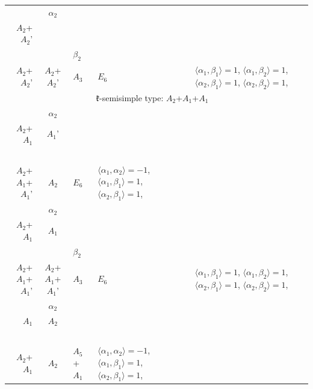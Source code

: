 \documentclass[12pt]{report}
\begin{document}
\begin{appendix}
{\begin{longtable}{rcl p{1cm}p{1cm}p{3cm} }
\\
\begin{tabular}{cc}$\alpha_1$+ & $\alpha_2$\\\tiny{ $A_2$+$A_2$' } & \tiny{  }\end{tabular} &\begin{tabular}{c} = \\~ \end{tabular} & \begin{tabular}{cc}$\beta_1$+ & $\beta_2$\\\tiny{ $A_2$+$A_2$' } & \tiny{ $A_2$+$A_2$' }\end{tabular} & $A_3$ & $E_6$ &  $\langle\alpha_1, \beta_1\rangle=1$, $\langle\alpha_1, \beta_2\rangle=1$, $\langle\alpha_2, \beta_1\rangle=1$, $\langle\alpha_2, \beta_2\rangle=1$, 
\\
\hline\multicolumn{5}{c}{$\mathfrak{k}$-semisimple type: $A_2$+$A_1$+$A_1$}\\
\hline\hline\begin{tabular}{cc}$\alpha_1$+ & $\alpha_2$\\\tiny{ $A_2$+$A_1$ } & \tiny{ $A_1$' }\end{tabular} &\begin{tabular}{c} = \\~ \end{tabular} & \begin{tabular}{c}$\beta_1$\\\tiny{ $A_2$+$A_1$+$A_1$' }\end{tabular} & $A_2$ & $E_6$ & $\langle\alpha_1, \alpha_2\rangle=-1$,  $\langle\alpha_1, \beta_1\rangle=1$, $\langle\alpha_2, \beta_1\rangle=1$, 
\\
\begin{tabular}{cc}$\alpha_1$+ & $\alpha_2$\\\tiny{ $A_2$+$A_1$ } & \tiny{ $A_1$ }\end{tabular} &\begin{tabular}{c} = \\~ \end{tabular} & \begin{tabular}{cc}$\beta_1$+ & $\beta_2$\\\tiny{ $A_2$+$A_1$+$A_1$' } & \tiny{ $A_2$+$A_1$+$A_1$' }\end{tabular} & $A_3$ & $E_6$ &  $\langle\alpha_1, \beta_1\rangle=1$, $\langle\alpha_1, \beta_2\rangle=1$, $\langle\alpha_2, \beta_1\rangle=1$, $\langle\alpha_2, \beta_2\rangle=1$, 
\\
\begin{tabular}{cc}$\alpha_1$+ & $\alpha_2$\\\tiny{ $A_1$ } & \tiny{ $A_2$ }\end{tabular} &\begin{tabular}{c} = \\~ \end{tabular} & \begin{tabular}{c}$\beta_1$\\\tiny{ $A_2$+$A_1$ }\end{tabular} & $A_2$ & $A_5$+$A_1$ & $\langle\alpha_1, \alpha_2\rangle=-1$,  $\langle\alpha_1, \beta_1\rangle=1$, $\langle\alpha_2, \beta_1\rangle=1$, 

\end{longtable}}
\end{appendix}
\end{document}
